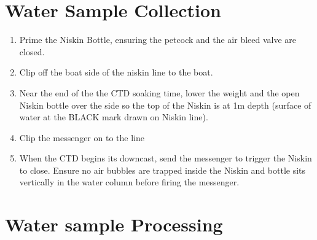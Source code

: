 \documentclass[
]{book}
\providecommand{\tightlist}{%
  \setlength{\itemsep}{0pt}\setlength{\parskip}{0pt}}
\begin{document}
\hypertarget{water-sample-collection}{%
\section{Water Sample Collection}\label{water-sample-collection}}

\begin{enumerate}
\def\labelenumi{\arabic{enumi}.}
\tightlist
\item
  Prime the Niskin Bottle, ensuring the petcock and the air bleed valve are closed.
\item
  Clip off the boat side of the niskin line to the boat.
\item
  Near the end of the the CTD soaking time, lower the weight and the open Niskin bottle over the side so the top of the Niskin is at 1m depth (surface of water at the BLACK mark drawn on Niskin line).
\item
  Clip the messenger on to the line
\item
  When the CTD begins its downcast, send the messenger to trigger the Niskin to close. Ensure no air bubbles are trapped inside the Niskin and bottle sits vertically in the water column before firing the messenger.
\end{enumerate}

\hypertarget{water-sample-processing}{%
\section{Water sample Processing}\label{water-sample-processing}}
\end{document}
